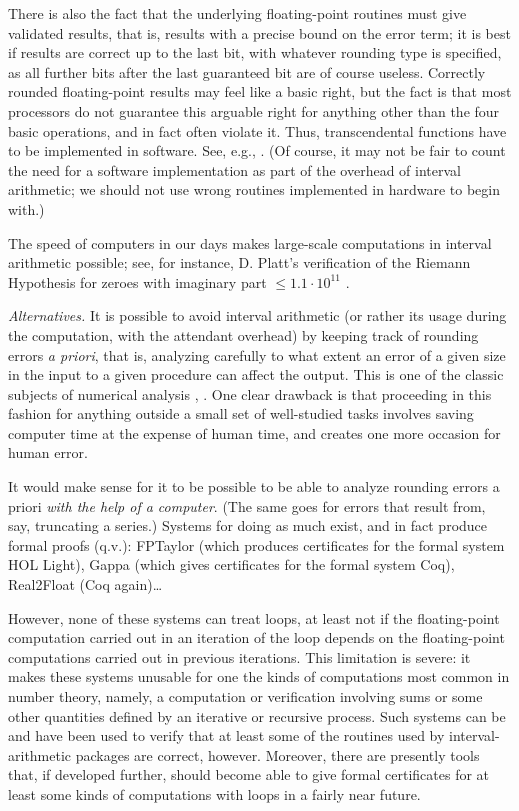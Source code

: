   There is also the fact
  that the underlying floating-point routines must give validated results,
  that is, results with a precise bound on the error term; it is best if
  results are correct up to the last bit, with whatever rounding type
  is specified, as all further bits after the last guaranteed bit are of course
  useless. Correctly rounded floating-point results may feel like a basic
  right, but the fact is that most processors do not guarantee this
  arguable right
  for anything other than the four basic operations,
  and in fact often violate it.
  Thus, transcendental functions have to be implemented in software. See, e.g.,
  \cite{crlibm}. (Of course, it may not be fair to count the need for
  a software implementation as part of the overhead of interval arithmetic;
  we should not use wrong routines implemented in hardware to begin with.)
  
  The speed of computers in our days makes large-scale computations in interval
  arithmetic possible; see, for instance,
  D. Platt's verification of the Riemann Hypothesis for zeroes with imaginary
  part $\leq 1.1\cdot 10^{11}$ \cite{Platt}.

  {\em Alternatives.}  It is possible to avoid interval arithmetic (or rather its usage during the computation, with the attendant
  overhead) by keeping
  track of rounding errors {\em a priori}, that is,
  analyzing carefully to what extent an error of a given size
  in the input to a given procedure can affect the output.
  This is one of the classic subjects of numerical analysis
  \cite{Wilkinson}, \cite{Higham}.
  One clear drawback is that proceeding in this fashion for anything
  outside a small set of well-studied tasks involves saving computer time at the
  expense of human time, and creates one more occasion for human error.

  It would make sense for it to be possible to be able to analyze rounding
  errors a priori {\em with the help of a computer}. (The same goes
  for errors that result from, say, truncating a series.) Systems for doing
  as much exist, and in fact produce formal proofs (q.v.): FPTaylor
  (which produces certificates for the formal system HOL Light),
  Gappa (which gives certificates for the formal system Coq), Real2Float
  (Coq again)\dots

  However, none of these systems can treat loops, at least not if the
  floating-point computation carried out in an iteration of the loop
  depends on the floating-point computations carried out in previous iterations.
  This
  limitation is severe: it makes these systems unusable for one the kinds of computations
  most common in number theory, namely, a computation or verification involving
 sums or some other quantities defined by an iterative or recursive process. Such systems can be and have been
  used to verify
  that at least some of the routines used by interval-arithmetic packages are
  correct, however. Moreover, there are presently tools that, if developed
  further, should become able to give formal certificates for at least some
  kinds of computations with loops in a fairly near future.
  
